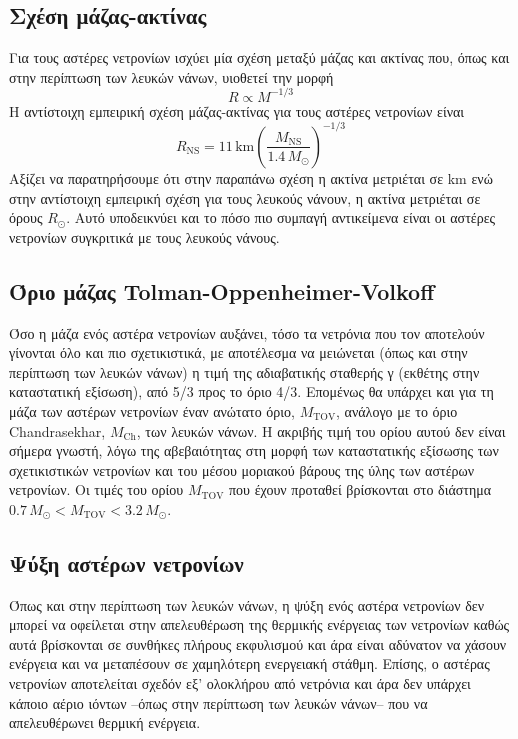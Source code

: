 \subsection{Σχέση μάζας-ακτίνας}
Για τους αστέρες νετρονίων ισχύει μία σχέση μεταξύ μάζας και ακτίνας που, όπως και στην περίπτωση των λευκών νάνων, υιοθετεί την μορφή 
\begin{equation*}
	R \propto M^{-1/3}
\end{equation*}
Η αντίστοιχη εμπειρική σχέση μάζας-ακτίνας για τους αστέρες νετρονίων είναι
\begin{equation}
	R_{\text{NS}} = 11\,\text{km} \left( \frac{M_{\text{NS}}}{1.4\,M_\odot} \right)^{-1/3}
\end{equation}
Αξίζει να παρατηρήσουμε ότι στην παραπάνω σχέση η ακτίνα μετριέται σε km ενώ στην αντίστοιχη εμπειρική σχέση για τους λευκούς νάνουν, η ακτίνα μετριέται σε όρους $R_\odot$. Αυτό υποδεικνύει και το πόσο πιο συμπαγή αντικείμενα είναι οι αστέρες νετρονίων συγκριτικά με τους λευκούς νάνους.

\subsection{Όριο μάζας Tolman-Oppenheimer-Volkoff}
Όσο η μάζα ενός αστέρα νετρονίων αυξάνει, τόσο τα νετρόνια που τον αποτελούν γίνονται όλο και πιο σχετικιστικά, με αποτέλεσμα να μειώνεται (όπως και στην περίπτωση των λευκών νάνων) η τιμή της αδιαβατικής σταθερής γ (εκθέτης στην καταστατική εξίσωση), από 5/3 προς το όριο 4/3. Επομένως θα υπάρχει και για τη μάζα των αστέρων νετρονίων έναν ανώτατο όριο, $M_{\text{TOV}}$, ανάλογο με το όριο Chandrasekhar, $M_{\text{Ch}}$, των λευκών νάνων. Η ακριβής τιμή του ορίου αυτού δεν είναι σήμερα γνωστή, λόγω της αβεβαιότητας στη μορφή των καταστατικής εξίσωσης των σχετικιστικών νετρονίων και του μέσου μοριακού βάρους της ύλης των αστέρων νετρονίων. Οι τιμές του ορίου $M_{\text{TOV}}$ που έχουν προταθεί βρίσκονται στο διάστημα $0.7\,M_\odot < M_{\text{TOV}} < 3.2\,M_\odot$.

\subsection{Ψύξη αστέρων νετρονίων}
Όπως και στην περίπτωση των λευκών νάνων, η ψύξη ενός αστέρα νετρονίων δεν μπορεί να οφείλεται στην απελευθέρωση της θερμικής ενέργειας των νετρονίων καθώς αυτά βρίσκονται σε συνθήκες πλήρους εκφυλισμού και άρα είναι αδύνατον να χάσουν ενέργεια και να μεταπέσουν σε χαμηλότερη ενεργειακή στάθμη. Επίσης, ο αστέρας νετρονίων αποτελείται σχεδόν εξ' ολοκλήρου από νετρόνια και άρα δεν υπάρχει κάποιο αέριο ιόντων --όπως στην περίπτωση των λευκών νάνων-- που να απελευθέρωνει θερμική ενέργεια.

